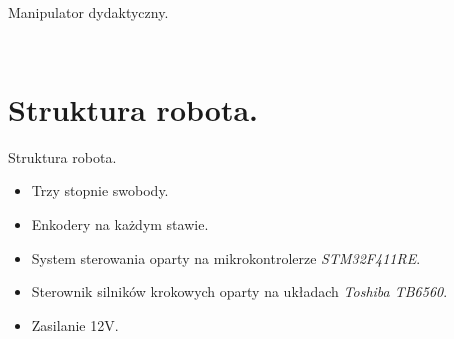 \documentclass{beamer}
\begin{document}
\begin{frame}{Manipulator dydaktyczny.}
\begin{columns}[T]
\begin{column}{.5\textwidth}
\begin{figure}
			\label{fig:example}%
		\end{figure}
	\end{column}
\end{columns}
\end{frame}

\section{Struktura robota.}

\begin{frame}{Struktura robota.}
	\begin{itemize}
		\item {Trzy stopnie swobody.}
		\item {Enkodery na każdym stawie}.
		\item {System sterowania oparty na mikrokontrolerze \textit{STM32F411RE}.}
		\item {Sterownik silników krokowych oparty na układach \textit{Toshiba TB6560}.}
		\item {Zasilanie 12\textsc{V}.}
	\end{itemize}
\end{frame}
\end{document}
